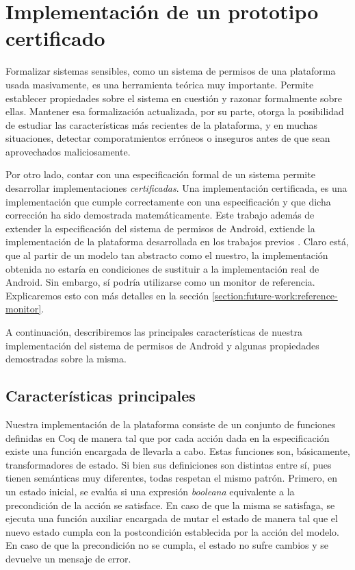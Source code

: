 \chapter{Implementación de un prototipo certificado}
\label{chapter:implementation}
Formalizar sistemas sensibles, como un sistema de permisos de una plataforma usada masivamente, es
una herramienta teórica muy importante. Permite establecer propiedades sobre el sistema en cuestión
y razonar formalmente sobre ellas. Mantener esa formalización actualizada, por su parte, otorga la
posibilidad de estudiar las características más recientes de la plataforma, y en muchas situaciones,
detectar comporatmientos erróneos o inseguros antes de que sean aprovechados maliciosamente.

Por otro lado, contar con una especificación formal de un sistema permite desarrollar
implementaciones \textit{certificadas}. Una implementación certificada, es una implementación que
cumple correctamente con una especificación y que dicha corrección ha sido demostrada
matemáticamente. Este trabajo además de extender la especificación del sistema de permisos de
Android, extiende la implementación de la plataforma desarrollada en los trabajos previos
\cite{betarte-2017,luna-cleiej}. Claro está, que al partir de un modelo tan abstracto como el
nuestro, la implementación obtenida no estaría en condiciones de sustituir a la implementación real
de Android. Sin embargo, sí podría utilizarse como un monitor de referencia. Explicaremos esto con
más detalles en la sección \ref{section:future-work:reference-monitor}.

A continuación, describiremos las principales características de nuestra implementación del sistema
de permisos de Android y algunas propiedades demostradas sobre la misma.

\section{Características principales}
Nuestra implementación de la plataforma consiste de un conjunto de funciones definidas en Coq de
manera tal que por cada acción dada en la especificación existe una función encargada de llevarla a
cabo. Estas funciones son, básicamente, transformadores de estado. Si bien sus definiciones son
distintas entre sí, pues tienen semánticas muy diferentes, todas respetan el mismo patrón. Primero,
en un estado inicial, se evalúa si una expresión \textit{booleana} equivalente a la precondición de
la acción se satisface. En caso de que la misma se satisfaga, se ejecuta una función auxiliar
encargada de mutar el estado de manera tal que el nuevo estado cumpla con la postcondición
establecida por la acción del modelo. En caso de que la precondición no se cumpla, el estado no
sufre cambios y se devuelve un mensaje de error.

